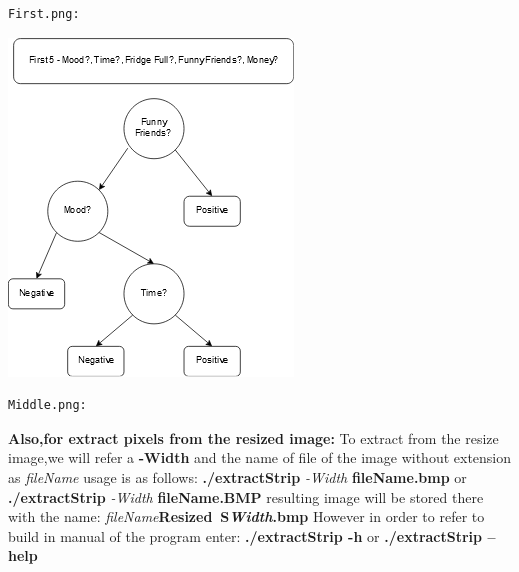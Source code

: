 \documentclass{article}
\begin{document}
\begin{minipage}{0.5\textwidth}
\begin{verbatim}
First.png:
\end{verbatim}
\begin{center}
\includegraphics[scale=1]{First.png}
\end{center}
\end{minipage}
\begin{minipage}{0.5\textwidth}
\begin{verbatim}
Middle.png:
\end{verbatim}
\end{minipage}
\parindent=1.5cm
\newline
\newline
\newline



\textbf{Also,for extract pixels from the resized image:}
To extract from the resize image,we will refer 
a  \textbf{ -Width} and the name of file of the image without extension as \textit{fileName} usage is as follows:\newline
\indent\textbf{./extractStrip }\textit{-Width}  \textbf{fileName.bmp}\newline
or\newline
\indent\textbf{./extractStrip}\textit{ -Width} \textbf{fileName.BMP}\newline
 resulting image will be stored there with the name:\newline
\indent \textit{  fileName}\textbf{Resized\textunderscore\
S\textit{Width}}\textit{}\textbf{.bmp}\newline
However in order to refer to build in manual of the program enter:\newline
\indent\textbf{./extractStrip -h}\newline
or\newline
\indent\textbf{./extractStrip  --help}
\end{document}
